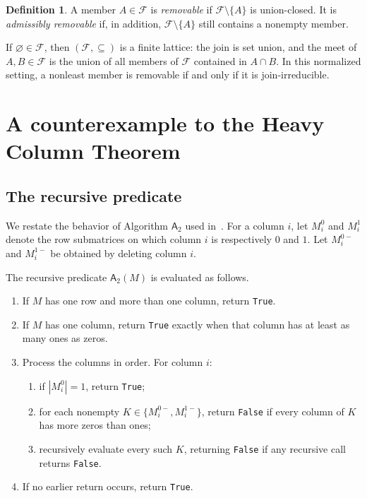 \documentclass[11pt]{amsart}
\theoremstyle{definition}
\newtheorem{definition}[theorem]{Definition}
\theoremstyle{remark}
\newcommand{\F}{\mathcal F}
\newcommand{\Aalg}{\mathsf A_2}
\newcommand{\True}{\texttt{True}}
\newcommand{\False}{\texttt{False}}
\begin{document}
\begin{definition}
A member $A\in\F$ is \emph{removable} if $\F\setminus\{A\}$ is union-closed. It is \emph{admissibly removable} if, in addition, $\F\setminus\{A\}$ still contains a nonempty member.
\end{definition}

If $\varnothing\in\F$, then $(\F,\subseteq)$ is a finite lattice: the join is set union, and the meet of $A,B\in\F$ is the union of all members of $\F$ contained in $A\cap B$. In this normalized setting, a nonleast member is removable if and only if it is join-irreducible.

\section{A counterexample to the Heavy Column Theorem}\label{sec:a2}

\subsection{The recursive predicate}

We restate the behavior of Algorithm $\Aalg$ used in~\cite{AbdurakhmanovHeavy2026,AbdurakhmanovFrankl2026}. For a column $i$, let $M_i^0$ and $M_i^1$ denote the row submatrices on which column $i$ is respectively $0$ and $1$. Let $M_i^{0-}$ and $M_i^{1-}$ be obtained by deleting column $i$.

The recursive predicate $\Aalg(M)$ is evaluated as follows.
\begin{enumerate}[label=(A\arabic*)]
  \item If $M$ has one row and more than one column, return \True.
  \item If $M$ has one column, return \True{} exactly when that column has at least as many ones as zeros.
  \item Process the columns in order. For column $i$:
  \begin{enumerate}[label=(\alph*)]
    \item if $|M_i^0|=1$, return \True;
    \item for each nonempty $K\in\{M_i^{0-},M_i^{1-}\}$, return \False{} if every column of $K$ has more zeros than ones;
    \item recursively evaluate every such $K$, returning \False{} if any recursive call returns \False.
  \end{enumerate}
  \item If no earlier return occurs, return \True.
\end{enumerate}
\end{document}
